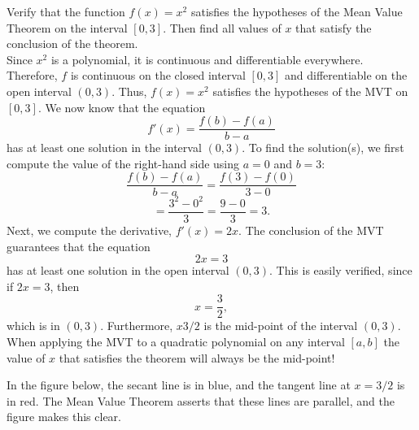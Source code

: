 \documentclass[handout]{ximera}
\begin{document}
\begin{example}[example 3]
Verify that the function $f(x) = x^2$ satisfies the hypotheses of the Mean Value Theorem
on the interval $[0,3]$. Then find all values of $x$ that satisfy the conclusion of the theorem.\\
Since $x^2$ is a polynomial, it is continuous and differentiable everywhere. Therefore, $f$ is continuous on the closed interval $[0, 3]$ and differentiable on the open interval $(0, 3)$. 
Thus, $f(x) = x^2$ satisfies the hypotheses of the MVT on $[0, 3]$. We now know that the equation
\[
f'(x) = \frac{f(b) - f(a)}{b-a}
\]
has at least one solution in the interval $(0, 3)$. To find the solution(s), 
we first compute the value of the right-hand side using $a = 0$ and $b = 3$:
\[\frac{f(b) - f(a)}{b-a} = \frac{f(3) - f(0)}{3-0} \]
\[= \frac{3^2 - 0^2}{3}= \frac{9 - 0}{3} = 3.\]
Next, we compute the derivative, $f'(x) = 2x$.
The conclusion of the MVT guarantees that the equation
\[2x = 3\]
has at least one solution in the open interval $(0,3)$.
This is easily verified, since if $2x = 3$, then 
\[x = \frac{3}{2},
\]
which is in $(0, 3)$.
Furthermore, $x 3/2$ is the mid-point of the interval $(0, 3)$.
When applying the MVT to a quadratic polynomial on any interval $[a, b]$ the value of $x$ that satisfies the theorem will always be the mid-point!

In the figure below, the secant line is in blue, 
and the tangent line at $x = 3/2$ is in red. The Mean Value Theorem asserts that these lines are parallel, and the figure makes this clear.

\begin{image}
\end{image}


\end{example}
\end{document}
